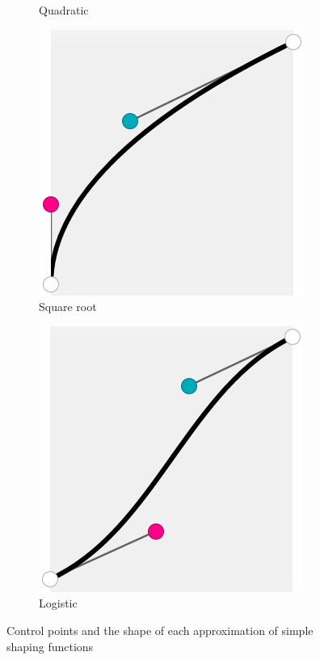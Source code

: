 \begin{figure}
\begin{subfigure}{0.24\textwidth}
		\caption{Quadratic}
	\end{subfigure}
	\begin{subfigure}{0.24\textwidth}
		\centering
		\includegraphics[width=1\linewidth]{figures/approx_root}
		\caption{Square root}
	\end{subfigure}
	\begin{subfigure}{0.24\textwidth}
		\centering
		\includegraphics[width=1\linewidth]{figures/approx_S10}
		\caption{Logistic}
	\end{subfigure}
	\caption{Control points and the shape of each approximation of simple shaping functions}
	\label{fig:control_points}
\end{figure}

